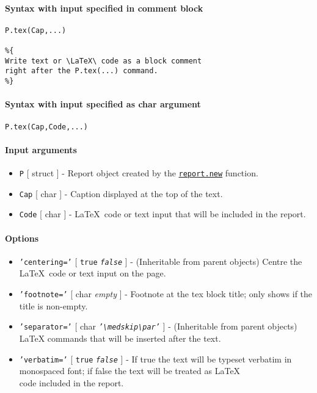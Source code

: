 


	\paragraph{Syntax with input specified in comment
block}

\begin{verbatim}
P.tex(Cap,...)

%{
Write text or \LaTeX\ code as a block comment
right after the P.tex(...) command.
%}
\end{verbatim}

\paragraph{Syntax with input specified as char
argument}

\begin{verbatim}
P.tex(Cap,Code,...)
\end{verbatim}

\paragraph{Input arguments}

\begin{itemize}
\item
  \texttt{P} {[} struct {]} - Report object created by the
  \href{report/new}{\texttt{report.new}} function.
\item
  \texttt{Cap} {[} char {]} - Caption displayed at the top of the text.
\item
  \texttt{Code} {[} char {]} - \LaTeX~code or text input that will be
  included in the report.
\end{itemize}

\paragraph{Options}

\begin{itemize}
\item
  \texttt{'centering='} {[} \texttt{true} \textbar{}
  \emph{\texttt{false}} {]} - (Inheritable from parent objects) Centre
  the \LaTeX~code or text input on the page.
\item
  \texttt{'footnote='} {[} char \textbar{} \emph{empty} {]} - Footnote
  at the tex block title; only shows if the title is non-empty.
\item
  \texttt{'separator='} {[} char \textbar{}
  \emph{\texttt{'\textbackslash{}medskip\textbackslash{}par'}} {]} -
  (Inheritable from parent objects) LaTeX commands that will be inserted
  after the text.
\item
  \texttt{'verbatim='} {[} \texttt{true} \textbar{}
  \emph{\texttt{false}} {]} - If true the text will be typeset verbatim
  in monospaced font; if false the text will be treated as \LaTeX\\code
  included in the report.
\end{itemize}


